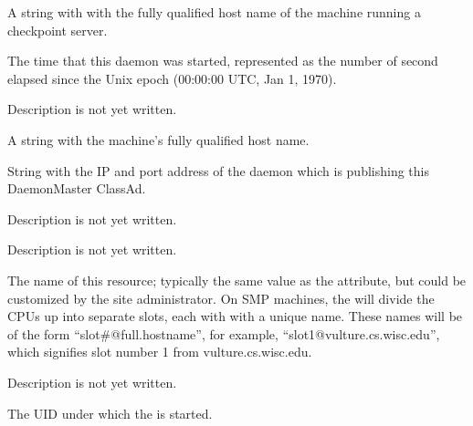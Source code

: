 \begin{description}

\item[\AdAttr{CkptServer}:] A string with with the fully qualified
  host name of the machine running a checkpoint server.

\item[\AdAttr{DaemonStartTime}:] The time that this daemon was
  started, represented as the number of second elapsed since
  the Unix epoch (00:00:00 UTC, Jan 1, 1970).

\item[\AdAttr{LastHeardFrom}:] Description is not yet written.

\item[\AdAttr{Machine}:] A string with the machine's fully qualified 
  host name.

\item[\AdAttr{MasterIpAddr}:] String with the IP and port address of the
 daemon which is publishing this DaemonMaster ClassAd.

\item[\AdAttr{MyAddress}:] Description is not yet written.

\item[\AdAttr{MyCurrentTime}:] Description is not yet written.

\item[\AdAttr{Name}:] The name of this resource; typically the same value as
  the  attribute, but could be customized by the site
  administrator.
  On SMP machines, the  will divide the CPUs up into separate
  slots, each with with a unique name.
  These names will be of the form ``slot\#@full.hostname'', for example,
  ``slot1@vulture.cs.wisc.edu'', which signifies slot number 1 from
  vulture.cs.wisc.edu.

\item[\AdAttr{PublicNetworkIpAddr}:] Description is not yet written.

\item[\AdAttr{RealUid}:] The UID under which the  is started.


\end{description}

